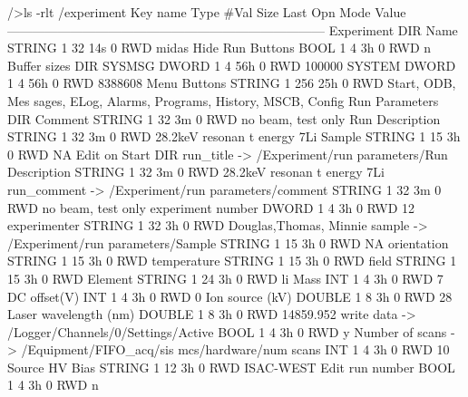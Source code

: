 \begin{DoxyCode}
/>ls -rlt /experiment
Key name                        Type    #Val  Size  Last Opn Mode Value
---------------------------------------------------------------------------
Experiment                      DIR
    Name                        STRING  1     32    14s  0   RWD  midas
    Hide Run Buttons            BOOL    1     4     3h   0   RWD  n
    Buffer sizes                DIR
        SYSMSG                  DWORD   1     4     56h  0   RWD  100000
        SYSTEM                  DWORD   1     4     56h  0   RWD  8388608
    Menu Buttons                STRING  1     256   25h  0   RWD  Start, ODB, Mes
      sages, ELog, Alarms, Programs, History, MSCB, Config
    Run Parameters              DIR
        Comment                 STRING  1     32    3m   0   RWD   no beam, test 
      only
        Run Description         STRING  1     32    3m   0   RWD  28.2keV resonan
      t energy 7Li
        Sample                  STRING  1     15    3h   0   RWD  NA
    Edit on Start               DIR
        run_title -> /Experiment/run parameters/Run Description
                                STRING  1     32    3m   0   RWD  28.2keV resonan
      t energy 7Li
        run_comment -> /Experiment/run parameters/comment
                                STRING  1     32    3m   0   RWD   no beam, test 
      only
        experiment number       DWORD   1     4     3h   0   RWD  12
        experimenter            STRING  1     32    3h   0   RWD  Douglas,Thomas,
      Minnie
        sample ->  /Experiment/run parameters/Sample
                                STRING  1     15    3h   0   RWD  NA
        orientation             STRING  1     15    3h   0   RWD
        temperature             STRING  1     15    3h   0   RWD
        field                   STRING  1     15    3h   0   RWD
        Element                 STRING  1     24    3h   0   RWD  li
        Mass                    INT     1     4     3h   0   RWD  7
        DC offset(V)            INT     1     4     3h   0   RWD  0
        Ion source (kV)         DOUBLE  1     8     3h   0   RWD  28
        Laser wavelength (nm)   DOUBLE  1     8     3h   0   RWD  14859.952
        write data -> /Logger/Channels/0/Settings/Active
                                BOOL    1     4     3h   0   RWD  y
        Number of scans -> /Equipment/FIFO_acq/sis mcs/hardware/num scans
                                INT     1     4     3h   0   RWD  10
        Source HV Bias          STRING  1     12    3h   0   RWD  ISAC-WEST
        Edit run number         BOOL    1     4     3h   0   RWD  n

\end{DoxyCode}
